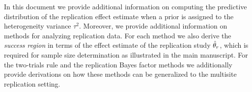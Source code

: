 \documentclass[a4paper, 11pt]{article}
\begin{document}
\maketitle

In this document we provide additional information on computing the predictive
distribution of the replication effect estimate when a prior is assigned to the
heterogeneity variance $\tau^{2}$. Moreover, we provide additional information
on methods for analyzing replication data. For each method we also derive the
\emph{success region} in terms of the effect estimate of the replication study
$\hat{\theta}_{r}$, which is required for sample size determination as illustrated in
the main manuscript. For the two-trials rule and the replication Bayes factor
methods we additionally provide derivations on how these methods can be
generalized to the multisite replication setting.

\end{document}
